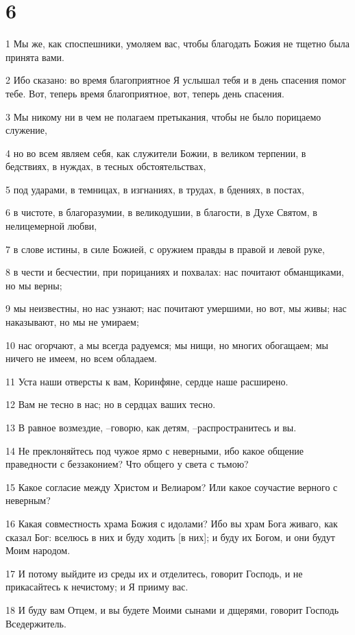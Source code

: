 \chapter{6}

\par 1 Мы же, как споспешники, умоляем вас, чтобы благодать Божия не тщетно была принята вами.
\par 2 Ибо сказано: во время благоприятное Я услышал тебя и в день спасения помог тебе. Вот, теперь время благоприятное, вот, теперь день спасения.
\par 3 Мы никому ни в чем не полагаем претыкания, чтобы не было порицаемо служение,
\par 4 но во всем являем себя, как служители Божии, в великом терпении, в бедствиях, в нуждах, в тесных обстоятельствах,
\par 5 под ударами, в темницах, в изгнаниях, в трудах, в бдениях, в постах,
\par 6 в чистоте, в благоразумии, в великодушии, в благости, в Духе Святом, в нелицемерной любви,
\par 7 в слове истины, в силе Божией, с оружием правды в правой и левой руке,
\par 8 в чести и бесчестии, при порицаниях и похвалах: нас почитают обманщиками, но мы верны;
\par 9 мы неизвестны, но нас узнают; нас почитают умершими, но вот, мы живы; нас наказывают, но мы не умираем;
\par 10 нас огорчают, а мы всегда радуемся; мы нищи, но многих обогащаем; мы ничего не имеем, но всем обладаем.
\par 11 Уста наши отверсты к вам, Коринфяне, сердце наше расширено.
\par 12 Вам не тесно в нас; но в сердцах ваших тесно.
\par 13 В равное возмездие, --говорю, как детям, --распространитесь и вы.
\par 14 Не преклоняйтесь под чужое ярмо с неверными, ибо какое общение праведности с беззаконием? Что общего у света с тьмою?
\par 15 Какое согласие между Христом и Велиаром? Или какое соучастие верного с неверным?
\par 16 Какая совместность храма Божия с идолами? Ибо вы храм Бога живаго, как сказал Бог: вселюсь в них и буду ходить [в них]; и буду их Богом, и они будут Моим народом.
\par 17 И потому выйдите из среды их и отделитесь, говорит Господь, и не прикасайтесь к нечистому; и Я прииму вас.
\par 18 И буду вам Отцем, и вы будете Моими сынами и дщерями, говорит Господь Вседержитель.

